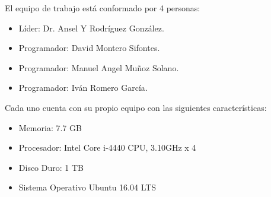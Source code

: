 El equipo de trabajo está conformado por 4 personas:
\begin{itemize}
    \item Líder: Dr. Ansel Y Rodríguez González. 
    \item Programador: David Montero Sifontes.
    \item Programador: Manuel Angel Muñoz Solano.
    \item Programador: Iván Romero García.
\end{itemize}
 
Cada uno cuenta con su propio equipo con las siguientes características:

\begin{itemize}
    \item Memoria: 7.7 GB
    \item Procesador: Intel Core i-4440 CPU, 3.10GHz x 4
    \item Disco Duro: 1 TB
    \item Sistema Operativo Ubuntu 16.04 LTS
\end{itemize} 